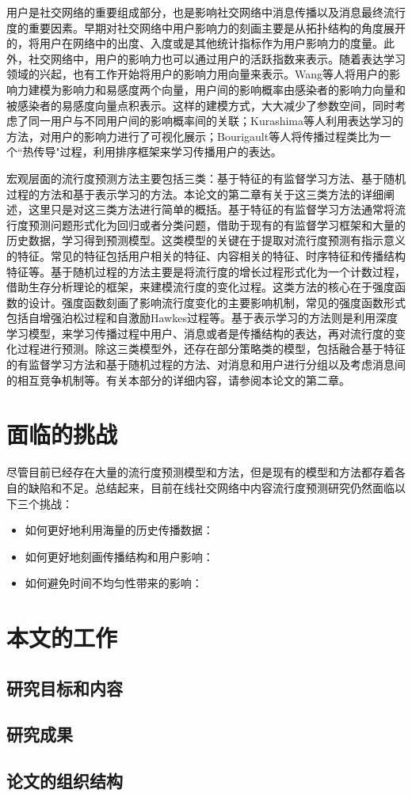 用户是社交网络的重要组成部分，也是影响社交网络中消息传播以及消息最终流行度的重要因素。早期对社交网络中用户影响力的刻画主要是从拓扑结构的角度展开的，将用户在网络中的出度、入度或是其他统计指标作为用户影响力的度量\citep{brown2011measuring,liang2012analyzing}。此外，社交网络中，用户的影响力也可以通过用户的活跃指数来表示\citep{li2013novel,cha2010measuring}。随着表达学习领域的兴起，也有工作开始将用户的影响力用向量来表示。Wang等人\citep{wang2015learning}将用户的影响力建模为影响力和易感度两个向量，用户间的影响概率由感染者的影响力向量和被感染者的易感度向量点积表示。这样的建模方式，大大减少了参数空间，同时考虑了同一用户与不同用户间的影响概率间的关联；Kurashima等人\citep{kurashima2014probabilistic}利用表达学习的方法，对用户的影响力进行了可视化展示；Bourigault等人\citep{bourigault2014learning}将传播过程类比为一个``热传导"过程，利用排序框架来学习传播用户的表达。

宏观层面的流行度预测方法主要包括三类：基于特征的有监督学习方法、基于随机过程的方法和基于表示学习的方法。本论文的第二章有关于这三类方法的详细阐述，这里只是对这三类方法进行简单的概括。基于特征的有监督学习方法通常将流行度预测问题形式化为回归或者分类问题，借助于现有的有监督学习框架和大量的历史数据，学习得到预测模型。这类模型的关键在于提取对流行度预测有指示意义的特征。常见的特征包括用户相关的特征、内容相关的特征、时序特征和传播结构特征等。基于随机过程的方法主要是将流行度的增长过程形式化为一个计数过程\citep{andersen1985counting}，借助生存分析理论\citep{klein2005survival}的框架，来建模流行度的变化过程。这类方法的核心在于强度函数的设计。强度函数刻画了影响流行度变化的主要影响机制，常见的强度函数形式包括自增强泊松过程\citep{pemantle2007survey}和自激励Hawkes过程\citep{hawkes1974cluster}等。基于表示学习的方法则是利用深度学习模型，来学习传播过程中用户、消息或者是传播结构的表达，再对流行度的变化过程进行预测。除这三类模型外，还存在部分策略类的模型，包括融合基于特征的有监督学习方法和基于随机过程的方法、对消息和用户进行分组以及考虑消息间的相互竞争机制等。有关本部分的详细内容，请参阅本论文的第二章。

\section{面临的挑战}
尽管目前已经存在大量的流行度预测模型和方法，但是现有的模型和方法都存着各自的缺陷和不足。总结起来，目前在线社交网络中内容流行度预测研究仍然面临以下三个挑战：
\begin{itemize}
\item 如何更好地利用海量的历史传播数据：
\item 如何更好地刻画传播结构和用户影响：
\item 如何避免时间不均匀性带来的影响：
\end{itemize}

\section{本文的工作}
\subsection{研究目标和内容}
\subsection{研究成果}
\subsection{论文的组织结构}
